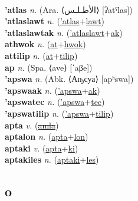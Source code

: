  \label{atunak} \\
\textbf{'atlas} \textit{n.} (Ara. ⟨الأطـلـس‎⟩ [ʔatˤlas])
 \label{'atlas} \\
\textbf{'atlaslawt} \textit{n.} (\hyperref['atlas]{'atlas}+\hyperref[lawt]{lawt})
 \label{'atlaslawt} \\
\textbf{'atlaslawtak} \textit{n.} (\hyperref['atlaslawt]{'atlaslawt}+\hyperref[ak]{ak})
 \label{'atlaslawtak} \\
\textbf{athwok} \textit{n.} (\hyperref[at]{at}+\hyperref[hwok]{hwok})
 \label{athwok} \\
\textbf{attilip} \textit{n.} (\hyperref[at]{at}+\hyperref[tilip]{tilip})
 \label{attilip} \\
\textbf{ap} \textit{n.} (Spa. ⟨ave⟩ [ˈaβe])
 \label{ap} \\
\textbf{'apswa} \textit{n.} (Abk. ⟨Аҧсуа⟩ [apʰswa])
 \label{'apswa} \\
\textbf{'apswaak} \textit{n.} (\hyperref['apswa]{'apswa}+\hyperref[ak]{ak})
 \label{'apswaak} \\
\textbf{'apswatec} \textit{n.} (\hyperref['apswa]{'apswa}+\hyperref[tec]{tec})
 \label{'apswatec} \\
\textbf{'apswatilip} \textit{n.} (\hyperref['apswa]{'apswa}+\hyperref[tilip]{tilip})
 \label{'apswatilip} \\
\textbf{apta} \textit{v.} (\hyperref[amla]{\sout{amla}})
 \label{apta} \\
\textbf{aptalon} \textit{n.} (\hyperref[apta]{apta}+\hyperref[lon]{lon})
 \label{aptalon} \\
\textbf{aptaki} \textit{v.} (\hyperref[apta]{apta}+\hyperref[ki]{ki})
 \label{aptaki} \\
\textbf{aptakiles} \textit{n.} (\hyperref[aptaki]{aptaki}+\hyperref[les]{les})
 \label{aptakiles} \\
\subsection{o}

